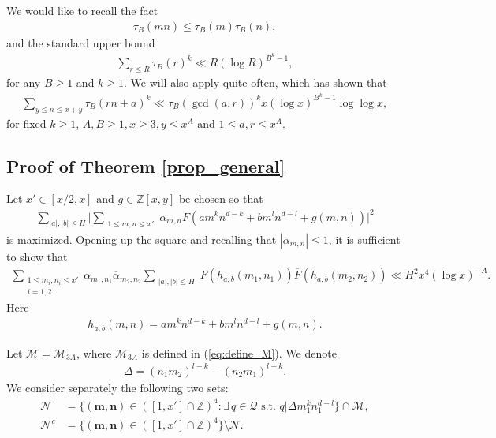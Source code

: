 \documentclass[reqno, 11pt]{amsart}
\renewcommand{\leq}{\leqslant}
\renewcommand{\geq}{\geqslant}
\theoremstyle{definition}
\theoremstyle{definition}
\renewcommand{\geq}{\geqslant}
\renewcommand{\leq}{\leqslant}
\newcommand{\mm}{\mathbf{m}}
\newcommand{\nn}{\mathbf{n}}
\newcommand{\ZZ}{\mathbb{Z}}
\numberwithin{equation}{section}
\begin{document}
We would like to recall the fact
\begin{align}\label{sub-tau}
    \tau_B(mn) \leq \tau_B(m) \tau_B(n),
\end{align}
and the standard upper bound
\begin{align}\label{sum-tau}
    \sum_{r \leq R} \tau_B(r)^k \ll R(\log R)^{B^k - 1},
\end{align}
for any $B \geq 1$ and $k \geq 1$.
We will also apply \cite[Lemma 2.8]{BST} quite often, which has shown that
\begin{align}\label{BST-2.8}
	\sum_{y \leq n \leq x + y} \tau_B(rn + a)^k \ll \tau_B(\gcd(a, r))^k x (\log x)^{B^k - 1} \log \log x,
\end{align}
for fixed $k \geq 1$, $A, B \geq 1, x \geq 3, y \leq x^A$ and $1 \leq a, r \leq x^A$. 



\subsection{Proof of Theorem \ref{prop_general}}

Let $x' \in [x/2, x]$ and $g \in \ZZ[x,y]$ be chosen so that 
\begin{eqnarray*}
	 \sum_{|a|,|b| \leq H} \Big| \sum_{\substack{1 \leq m, n \leq x'}} \alpha_{m,n} F(am^kn^{d-k} + bm^ln^{d-l} + g(m, n)) \Big|^2
\end{eqnarray*}
is maximized. 
Opening up the square and recalling that $|\alpha_{m, n}| \leq 1$, it is sufficient to show that 
\begin{align}\label{claim 1}
	\sum_{\substack{1 \leq m_i, n_i \leq x' \\ i = 1, 2}} \alpha_{m_1, n_1} \overline{\alpha}_{m_2, n_2} \sum_{\substack{|a|, |b| \leq H}} F(h_{a,b}(m_1, n_1)) \overline{F}(h_{a,b}(m_2,n_2))  \ll H^2 x^4 (\log x)^{-A}.
\end{align}
Here
\begin{eqnarray*}
	h_{a,b}(m, n) = am^kn^{d-k} + bm^ln^{d-l} + g(m, n).
\end{eqnarray*}

Let $\mathcal{M} = \mathcal{M}_{3A}$, where $\mathcal{M}_{3A}$ is defined in (\ref{eq:define_M}). We denote
\begin{align}\label{Def-Delta}
    \Delta = (n_1m_2)^{l-k} - (n_2m_1)^{l-k}.
\end{align}
We consider separately the following two sets:
\begin{align*}
	\mathcal{N} & = \{ (\mm,\nn) \in ([1, x'] \cap \ZZ)^4: \exists \, q \in \mathcal{Q} \text{ s.t. } q | \Delta m_1^k n_1^{d-l} \} \cap \mathcal{M}, \\
	\mathcal{N}^c & = \{(\mm, \nn) \in ([1, x'] \cap \ZZ)^4\} \setminus \mathcal{N}.
\end{align*}
\end{document}
